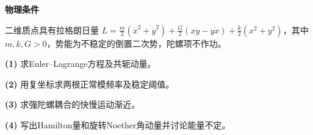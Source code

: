 \textbf{物理条件}\par 二维质点具有拉格朗日量 \(L=\tfrac m2(\dot x^2+\dot y^2)+\tfrac G2(x\dot y-y\dot x)+\tfrac k2(x^2+y^2)\)，其中 \(m,k,G>0\)，势能为不稳定的倒置二次势，陀螺项不作功。
\par\noindent\textbf{(1)} 求Euler–Lagrange方程及共轭动量。
\par\noindent\textbf{(2)} 用复坐标求两根正常模频率及稳定阈值。
\par\noindent\textbf{(3)} 求强陀螺耦合的快慢运动渐近。
\par\noindent\textbf{(4)} 写出Hamilton量和旋转Noether角动量并讨论能量不定。
